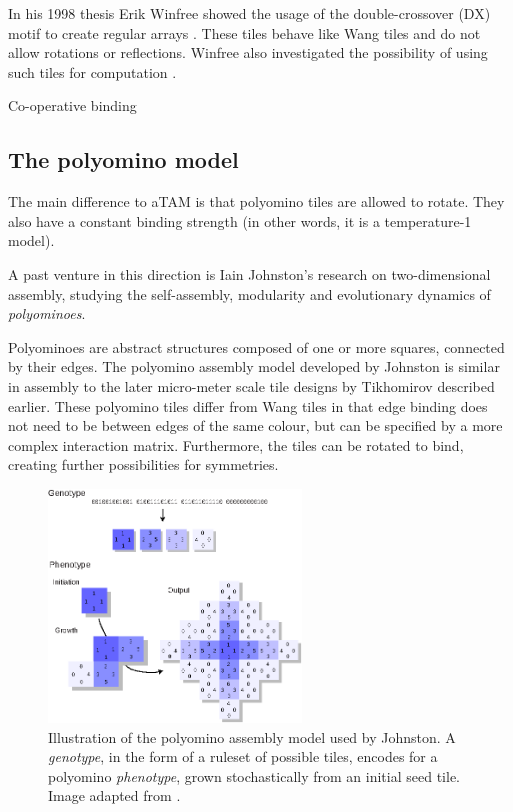 In his 1998 thesis Erik Winfree showed the usage of the double-crossover (DX) motif to create regular arrays \cite{winfree1998design}. These tiles behave like Wang tiles\cite{wang1961proving} and do not allow rotations or reflections. Winfree also investigated the possibility of using such tiles for computation \cite{winfree1998algorithmic}.

Co-operative binding

\subsection{The polyomino model}

The main difference to aTAM is that polyomino tiles are allowed to rotate. They also have a constant binding strength (in other words, it is a temperature-1 model).

A past venture in this direction is Iain Johnston's research on two-dimensional assembly\cite{ahnert2010self}\cite{johnston2011evolutionary}, studying the self-assembly, modularity and evolutionary dynamics of \emph{polyominoes}.

Polyominoes are abstract structures composed of one or more squares, connected by their edges. The polyomino assembly model developed by Johnston is similar in assembly to the later micro-meter scale tile designs by Tikhomirov \cite{tikhomirov2017fractal} described earlier. These polyomino tiles differ from Wang tiles\cite{wang1961proving} in that edge binding does not need to be between edges of the same colour, but can be specified by a more complex interaction matrix. Furthermore, the tiles can be rotated to bind, creating further possibilities for symmetries.

\begin{figure}[h]
    \centering\includegraphics[width=0.6\textwidth]{figures/polyominoes.eps}
    \caption{Illustration of the polyomino assembly model used by Johnston. A \emph{genotype}, in the form of a ruleset of possible tiles, encodes for a polyomino \emph{phenotype}, grown stochastically from an initial seed tile. Image adapted from \cite{johnston2011evolutionary}.}
    \label{fig:polyominoes}
\end{figure}

